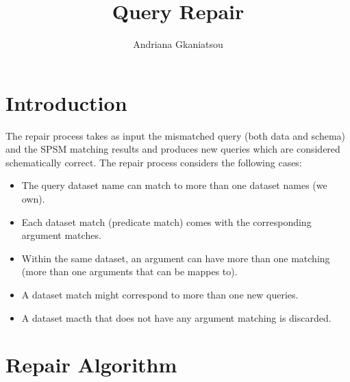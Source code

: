 \documentclass[a4paper,10pt]{article}
\title{Query Repair}
\author{Andriana Gkaniatsou}
\begin{document}
\maketitle


\section{Introduction}

The repair process takes as input the mismatched query (both data and schema) and the SPSM matching results and produces new queries which are considered 
schematically correct. The repair process considers the following cases:

\begin{itemize}
 \item The query dataset name can match to more than one dataset names (we own).
\item Each dataset match (predicate match) comes with the corresponding argument matches.
\item Within the same dataset, an argument can have more than one matching (more than one arguments that can be mappes to).
\item A dataset match might correspond to more than one new queries.
\item A dataset macth that does not have any argument matching is discarded.
\end{itemize}

\section{Repair Algorithm}
\end{document}
